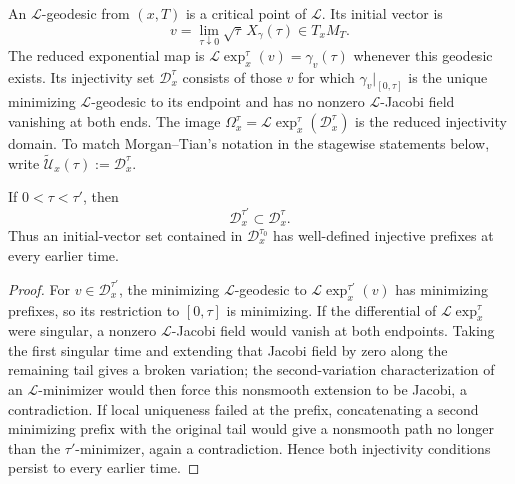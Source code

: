 \begin{definition}
\label{def:reduced-exponential-map}
\notready
An $\mathcal L$-geodesic from $(x,T)$ is a critical point of
$\mathcal L$.  Its initial vector is
\[
 v=\lim_{\tau\downarrow0}\sqrt\tau\,X_\gamma(\tau)
 \in T_xM_T.
\]
The reduced exponential map is
$\mathcal L\exp_x^\tau(v)=\gamma_v(\tau)$ whenever this geodesic exists.
Its injectivity set $\mathcal D_x^\tau$ consists of those $v$ for which
$\gamma_v|_{[0,\tau]}$ is the unique minimizing $\mathcal L$-geodesic to its
endpoint and has no nonzero $\mathcal L$-Jacobi field vanishing at both ends.
The image $\Omega_x^\tau=\mathcal L\exp_x^\tau(\mathcal D_x^\tau)$ is the
reduced injectivity domain.  To match Morgan--Tian's notation in the
stagewise statements below, write
$\widetilde{\mathcal U}_x(\tau):=\mathcal D_x^\tau$.
\end{definition}

\begin{proposition}
\label{prop:reduced-injectivity-set-monotonicity}
\notready
If $0<\tau<\tau'$, then
\[
 \mathcal D_x^{\tau'}\subset\mathcal D_x^\tau.
\]
Thus an initial-vector set contained in $\mathcal D_x^{\tau_0}$ has
well-defined injective prefixes at every earlier time.
\end{proposition}

\begin{proof}
For $v\in\mathcal D_x^{\tau'}$, the minimizing $\mathcal L$-geodesic
to $\mathcal L\exp_x^{\tau'}(v)$ has minimizing prefixes, so its restriction
to $[0,\tau]$ is minimizing.  If the differential of
$\mathcal L\exp_x^\tau$ were singular, a nonzero $\mathcal L$-Jacobi field
would vanish at both endpoints.  Taking the first singular time and extending
that Jacobi field by zero along the remaining tail gives a broken variation;
the second-variation characterization of an $\mathcal L$-minimizer would
then force this nonsmooth extension to be Jacobi, a contradiction.  If local
uniqueness failed at the prefix, concatenating a second minimizing prefix
with the original tail would give a nonsmooth path no longer than the
$\tau'$-minimizer, again a contradiction.  Hence both injectivity conditions
persist to every earlier time.
\end{proof}

